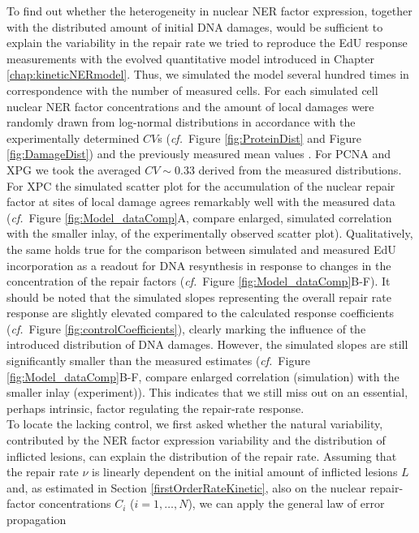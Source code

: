 To find out whether the heterogeneity in nuclear NER factor expression, together with the distributed amount of initial DNA damages, would be sufficient to explain the variability in the repair rate we tried to reproduce the EdU response measurements with the evolved quantitative model introduced in Chapter \ref{chap:kineticNERmodel}. Thus, we simulated the model several hundred times in correspondence with the number of measured cells. For each simulated cell nuclear NER factor concentrations and the amount of local damages were randomly drawn from log-normal distributions in accordance with the experimentally determined $CV$s (\textit{cf.}\ Figure \ref{fig:ProteinDist} and Figure \ref{fig:DamageDist}) and the previously measured mean values \cite{Luijsterburg2010}. For PCNA and XPG we took the averaged $CV\sim$0.33 derived from the measured distributions. \\
For XPC the simulated scatter plot for the accumulation of the nuclear repair factor at sites of local damage agrees remarkably well with the measured data (\textit{cf.}\ Figure \ref{fig:Model_dataComp}A, compare enlarged, simulated correlation with the smaller inlay, of the experimentally observed scatter plot). Qualitatively, the same holds true for the comparison between simulated and measured EdU incorporation as a readout for DNA resynthesis in response to changes in the concentration of the repair factors (\textit{cf.}\ Figure \ref{fig:Model_dataComp}B-F). It should be noted that the simulated slopes representing the overall repair rate response are slightly elevated compared to the calculated response coefficients (\textit{cf.}\ Figure \ref{fig:controlCoefficients}), clearly marking the influence of the introduced distribution of DNA damages. However, the simulated slopes are still significantly smaller than the measured estimates (\textit{cf.}\ Figure \ref{fig:Model_dataComp}B-F, compare enlarged correlation (simulation) with the smaller inlay (experiment)). This indicates that we still miss out on an essential, perhaps intrinsic, factor regulating the repair-rate response.\\    
To locate the lacking control, we first asked whether the natural variability, contributed by the NER factor expression variability and the distribution of inflicted lesions, can explain the distribution of the repair rate. Assuming that the repair rate $\nu$ is linearly dependent on the initial amount of inflicted lesions $L$ and, as estimated in Section \ref{firstOrderRateKinetic}, also on the nuclear repair-factor concentrations $C_i$ ($i=1,\ldots,N$), we can apply the general law of error propagation

